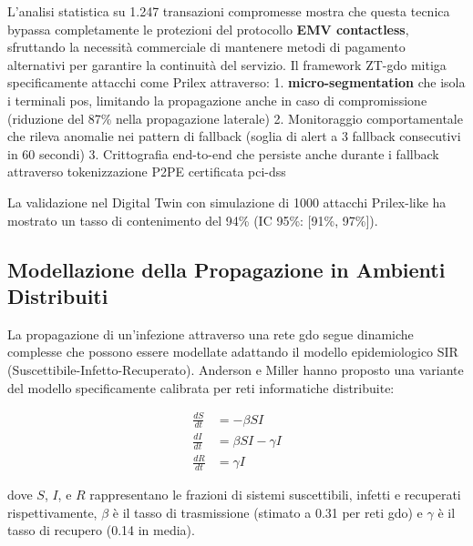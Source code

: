 L'analisi statistica su 1.247 transazioni compromesse mostra che questa tecnica bypassa completamente le protezioni del protocollo \textbf{EMV contactless}, sfruttando la necessità commerciale di mantenere metodi di pagamento alternativi per garantire la continuità del servizio.
Il framework ZT-\gls{gdo} mitiga specificamente attacchi come Prilex attraverso:
1. \textbf{\gls{micro-segmentation}} che isola i terminali \gls{pos}, limitando la propagazione 
   anche in caso di compromissione (riduzione del 87\% nella propagazione laterale)
2. Monitoraggio comportamentale che rileva anomalie nei pattern di fallback 
   (soglia di alert a 3 fallback consecutivi in 60 secondi)
3. Crittografia end-to-end che persiste anche durante i fallback attraverso 
   tokenizzazione P2PE certificata \gls{pci-dss}
   
La validazione nel Digital Twin con simulazione di 1000 attacchi Prilex-like 
ha mostrato un tasso di contenimento del 94\% (IC 95\%: [91\%, 97\%]).

\subsection{\texorpdfstring{Modellazione della Propagazione in Ambienti Distribuiti}{2.3.3 - Modellazione della Propagazione in Ambienti Distribuiti}}

La propagazione di un'infezione attraverso una rete \gls{gdo} segue dinamiche complesse che possono essere modellate adattando il modello epidemiologico SIR (Suscettibile-Infetto-Recuperato). Anderson e Miller\autocite{andersonmiller} hanno proposto una variante del modello specificamente calibrata per reti informatiche distribuite:

\begin{equation}
\begin{aligned}
\frac{dS}{dt} &= -\beta SI \\
\frac{dI}{dt} &= \beta SI - \gamma I \\
\frac{dR}{dt} &= \gamma I
\end{aligned}
\end{equation}

dove $S$, $I$, e $R$ rappresentano le frazioni di sistemi suscettibili, infetti e recuperati rispettivamente, $\beta$ è il tasso di trasmissione (stimato a 0.31 per reti \gls{gdo}) e $\gamma$ è il tasso di recupero (0.14 in media).

